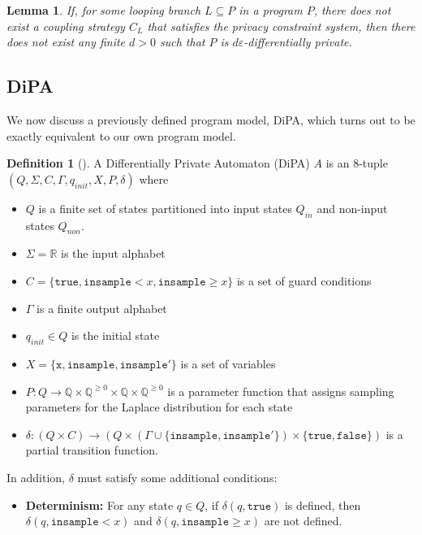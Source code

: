 \documentclass[12pt]{article}
\newcommand{\QQ}{\mathbb{Q}}
\newcommand{\RR}{\mathbb{R}}
\newcommand{\gguard}[1][x]{\texttt{insample}\geq #1}
\newcommand{\lguard}[1][x]{\texttt{insample} < #1}
\newtheorem{lemma}[thm]{Lemma}
\theoremstyle{definition}
\newtheorem{defn}[thm]{Definition}
\begin{document}
\begin{lemma}\label{ProgramCounterexampleLemma}
    If, for some looping branch $L\subseteq P$ in a program $P$, there does not exist a coupling strategy $C_L$ that satisfies the privacy constraint system, then there does not exist any finite $d>0$ such that $P$ is $d\varepsilon$-differentially private.
\end{lemma}

\subsection{DiPA}

We now discuss a previously defined program model, DiPA, which turns out to be exactly equivalent to our own program model. 

\begin{defn}[\cite{chadhaLinearTimeDecidability2021}]
    A Differentially Private Automaton (DiPA) $A$ is an 8-tuple $(Q, \Sigma, C, \Gamma, q_{init}, X, P, \delta)$ where
    \begin{itemize}
        \item $Q$ is a finite set of states partitioned into input states $Q_{in}$ and non-input states $Q_{non}$. 
        \item $\Sigma = \RR$ is the input alphabet
        \item $C = \{\texttt{true}, \lguard, \gguard\}$ is a set of guard conditions
        \item $\Gamma$ is a finite output alphabet
        \item $q_{init}\in Q$ is the initial state
        \item $X = \{\texttt{x}, \texttt{insample}, \texttt{insample}'\}$ is a set of variables
        \item $P: Q\to \QQ\times \QQ^{\geq 0}\times \QQ\times  \QQ^{\geq 0}$ is a parameter function that assigns sampling parameters for the Laplace distribution for each state
        \item $\delta:(Q\times C)\to (Q\times (\Gamma \cup \{\texttt{insample}, \texttt{insample}'\})\times \{\texttt{true}, \texttt{false}\})$ is a partial transition function. 
    \end{itemize}
    In addition, $\delta$ must satisfy some additional conditions:
    \begin{itemize}
        \item \textbf{Determinism:} For any state $q\in Q$, if $\delta(q,\texttt{true})$ is defined, then $\delta(q,\lguard)$ and $\delta(q,\gguard)$ are not defined. 


\end{itemize}
\end{defn}
\end{document}
